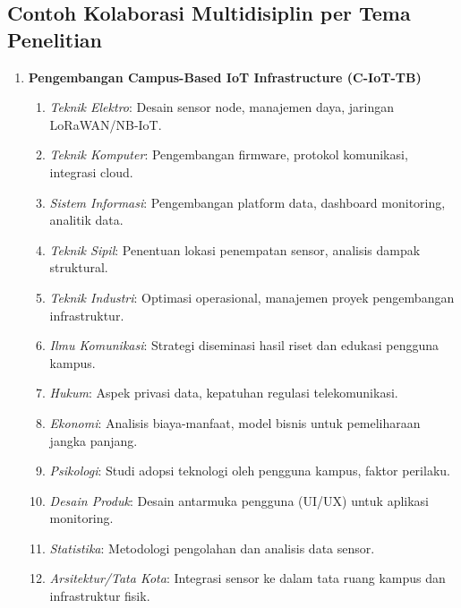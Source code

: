 \documentclass[12pt,a4paper]{article}
\begin{document}
\subsection{Contoh Kolaborasi Multidisiplin per Tema Penelitian}

\begin{enumerate}[leftmargin=*]
    \item \textbf{Pengembangan Campus-Based IoT Infrastructure (C-IoT-TB)}
          \begin{enumerate}
              \item \textit{Teknik Elektro}: Desain sensor node, manajemen daya, jaringan LoRaWAN/NB-IoT.
              \item \textit{Teknik Komputer}: Pengembangan firmware, protokol komunikasi, integrasi cloud.
              \item \textit{Sistem Informasi}: Pengembangan platform data, dashboard monitoring, analitik data.
              \item \textit{Teknik Sipil}: Penentuan lokasi penempatan sensor, analisis dampak struktural.
              \item \textit{Teknik Industri}: Optimasi operasional, manajemen proyek pengembangan infrastruktur.
              \item \textit{Ilmu Komunikasi}: Strategi diseminasi hasil riset dan edukasi pengguna kampus.
              \item \textit{Hukum}: Aspek privasi data, kepatuhan regulasi telekomunikasi.
              \item \textit{Ekonomi}: Analisis biaya-manfaat, model bisnis untuk pemeliharaan jangka panjang.
              \item   \textit{Psikologi}: Studi adopsi teknologi oleh pengguna kampus, faktor perilaku.
              \item  \textit{Desain Produk}: Desain antarmuka pengguna (UI/UX) untuk aplikasi monitoring.
              \item  \textit{Statistika}: Metodologi pengolahan dan analisis data sensor.
              \item \textit{Arsitektur/Tata Kota}: Integrasi sensor ke dalam tata ruang kampus dan infrastruktur fisik.
          \end{enumerate}


\end{enumerate}
\end{document}
